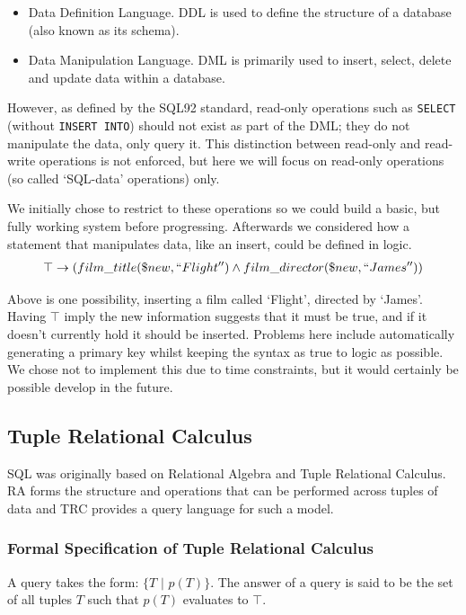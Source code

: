 \documentclass[a4paper, 11pt]{article}
\begin{document}
    \begin{itemize}
        \item
          Data Definition Language. DDL is used to define the structure of a
          database (also known as its schema).
        \item
          Data Manipulation Language. DML is primarily used to insert, select,
          delete and update data within a database.
    \end{itemize}

    However, as defined by the SQL92 standard\cite{isoSQL}, read-only operations
    such as \texttt{SELECT} (without \texttt{INSERT INTO}) should not exist as
    part of the DML; they do not manipulate the data, only query it. This
    distinction between read-only and read-write operations is not enforced, but
    here we will focus on read-only operations (so called `SQL-data' operations)
    only.

    We initially chose to restrict to these operations so we could build a basic,
    but fully working system before progressing. Afterwards we considered how
    a statement that manipulates data, like an insert, could be defined in logic.
    \begin{gather}
      \top \rightarrow (film\_title(\$new, ``Flight'') \land film\_director(\$new, ``James''))
    \end{gather}

    Above is one possibility, inserting a film called `Flight', directed by
    `James'. Having $\top$ imply the new information suggests that it must be
    true, and if it doesn't currently hold it should be inserted. Problems here
    include automatically generating a primary key whilst keeping the syntax as
    true to logic as possible. We chose not to implement this due to time
    constraints, but it would certainly be possible develop in the future.

  \subsection{Tuple Relational Calculus}
    SQL was originally based on Relational Algebra and Tuple Relational
    Calculus. RA forms the structure and operations that can be performed
    across tuples of data and TRC provides a query language for such a model.

    \subsubsection{Formal Specification of Tuple Relational Calculus\cite{lecRA}}
      \label{sec:formalTRC}
      A query takes the form: $\{T\text{ | }p(T)\}$. The answer of a query is
      said to be the set of all tuples $T$ such that $p(T)$ evaluates to $\top$.
\end{document}
